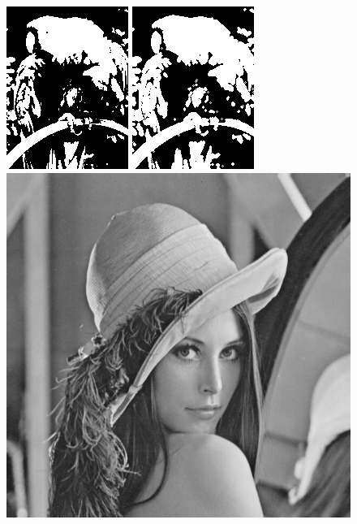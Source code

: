 \documentclass{article}
\begin{document}
\begin{figure}[!htb]
\centering
\includegraphics[scale=0.6]{img/papuga_1bit.png} 
\includegraphics[scale=0.6]{img/Erozja_Obrazu_papuga_1bit.png}\\
\includegraphics[scale=0.2]{img/lena_8bit.png} 

\end{figure}
\end{document}
